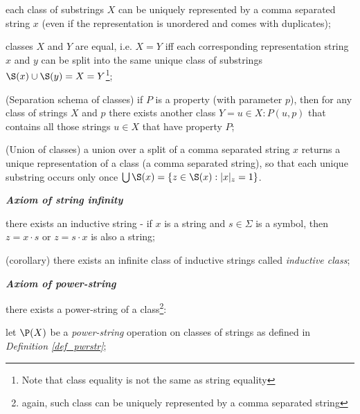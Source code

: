 \begin{definition}
\begin{legal}
\begin{legal}
      \item each class of substrings $X$ can be uniquely represented by a comma separated string $x$ (even if the representation is unordered and comes with duplicates);
      \item classes $X$ and $Y$ are equal, i.e. $X = Y$ iff each corresponding representation string $x$ and $y$ can be split into the same unique class of substrings $\S(x) \cup \S(y) = X = Y$\footnote{Note that class equality is not the same as string equality};
      \item (Separation schema of classes) if $P$ is a property (with parameter $p$), then for any class of strings $X$ and $p$ there exists another class $Y = {u \in X : P(u,p)}$ that contains all those strings $u \in X$ that have property $P$;
      \item (Union of classes) a union over a split of a comma separated string $x$ returns a unique representation of a class (a comma separated string), so that each unique substring occurs only once $\bigcup \S(x) = \{z \in \S(x) : |x|_z = 1\}$.
    \end{legal}
    \item \textbf{\textit{Axiom of string infinity}}
    \begin{legal}
      \item there exists an inductive string - if $x$ is a string and $s \in \Sigma$ is a symbol, then $z = x \cdot s$ or $z = s \cdot x$ is also a string;
      \item (corollary) there exists an infinite class of inductive strings called \textit{inductive class};
    \end{legal}
    \item \textbf{\textit{Axiom of power-string}}
    \begin{legal}
      \item there exists a power-string of a class\footnote{again, such class can be uniquely represented by a comma separated string}:
      \begin{legal}
        \item let $\P(X)$ be a \textit{power-string} operation on classes of strings as defined in \textit{Definition \ref{def_pwrstr}};

\end{legal}
\end{legal}
\end{legal}
\end{definition}
